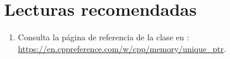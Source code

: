 \section{Lecturas recomendadas}

\begin{enumerate}

\item Consulta la página de referencia de la clase 
      en : \url{https://en.cppreference.com/w/cpp/memory/unique_ptr}.

\end{enumerate}

